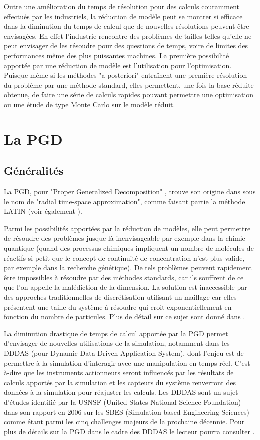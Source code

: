\documentclass[12pt,a4paper]{report}
\begin{document}
Outre une amélioration du temps de résolution pour des calculs couramment effectués par les industriels, la réduction de modèle peut se montrer si efficace dans la diminution du temps de calcul que de nouvelles résolutions peuvent être envisagées. En effet l'industrie rencontre des problèmes de tailles telles qu'elle ne peut envisager de les résoudre pour des questions de temps, voire de limites des performances même des plus puissantes machines. La première possibilité apportée par une réduction de modèle est l'utilisation pour l'optimisation. Puisque même si les méthodes "a posteriori" entraînent une première résolution du problème par une méthode standard, elles permettent, une fois la base réduite obtenue, de faire une série de calculs rapides pouvant permettre une optimisation ou une étude de type Monte Carlo sur le modèle réduit.

\section{La PGD}
\subsection{Généralités}
La PGD, pour "Proper Generalized Decomposition" , trouve son origine dans \cite{LATIN1} sous le nom de "radial time-space approximation", comme faisant partie la méthode LATIN (voir également \cite{LATIN2}). 

Parmi les possibilités apportées par la réduction de modèles, elle peut permettre de résoudre des problèmes jusque là inenvisageable par exemple dans la chimie quantique (quand des processus chimiques impliquent un nombre de molécules de réactifs si petit que le concept de continuité de concentration n'est plus valide, par exemple dans la recherche génétique). De tels problèmes peuvent rapidement être impossibles à résoudre par des méthodes standards, car ils souffrent de ce que l'on appelle la malédiction de la dimension. La solution est inaccessible par des approches traditionnelles de discrétisation utilisant un maillage car elles présentent une taille du système à résoudre qui croit exponentiellement en fonction du nombre de particules. Plus de détail sur ce sujet sont donné dans \cite{Paradigm}.

La diminution drastique de temps de calcul apportée par la PGD permet d'envisager de nouvelles utilisations de la simulation, notamment dans les DDDAS (pour Dynamic Data-Driven Application System), dont l'enjeu est de permettre à la simulation d'interagir avec une manipulation en temps réel. C'est-à-dire que les instruments actionneurs seront influencés par les résultats de calculs apportés par la simulation et les capteurs du système renverront des données à la simulation pour réajuster les calculs. Les DDDAS sont un sujet d'études identifié par la USNSF (United States National Science Foundation) dans son rapport en 2006 sur les SBES (Simulation-based Engineering Sciences) comme étant parmi les cinq challenges majeurs de la prochaine décennie. Pour plus de détails sur la PGD dans le cadre des DDDAS le lecteur pourra consulter \cite{DDAS}.
\end{document}
